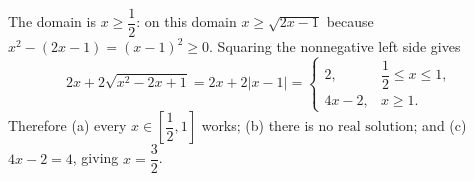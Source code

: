 The domain is $x\ge\dfrac{1}{2}$: on this domain $x\ge\sqrt{2x-1}$ because $x^2-(2x-1)=(x-1)^2\ge0$.
Squaring the nonnegative left side gives
\[
2x+2\sqrt{x^2-2x+1}=2x+2|x-1|
=\begin{cases}2,&\dfrac{1}{2}\le x\le1,\\4x-2,&x\ge1.\end{cases}
\]
Therefore (a) every $\boxed{x\in[\dfrac{1}{2},1]}$ works; (b) there is $\boxed{\text{no real solution}}$; and (c) $4x-2=4$, giving $\boxed{x=\dfrac{3}{2}}$.
